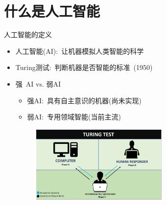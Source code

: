 \small
\section{什么是人工智能}
\begin{frame}{人工智能的定义}
  \begin{itemize}
	  \item 人工智能\textrm{(AI)}:~让机器模拟人类智能的科学
	  \item \textrm{Turing}测试:~判断机器是否智能的标准~\textrm{(1950)}
	  \item 强~\textrm{AI} \textrm{vs.} 弱\textrm{AI}
		  \vskip 2pt
    \begin{itemize}
	    \item 强\textrm{AI}:~具有自主意识的机器(尚未实现)
	    \item 弱\textrm{AI}:~专用领域智能(当前主流)
    \end{itemize}
  \end{itemize}
\begin{figure}[h!]
\vspace*{-0.10in}
\centering
\includegraphics[height=1.55in, width=3.2in, viewport=0 0 2250 1230,clip]{Figures/The_Turing-Test.png}
\label{Turing_TEST}
\end{figure}
\end{frame}

